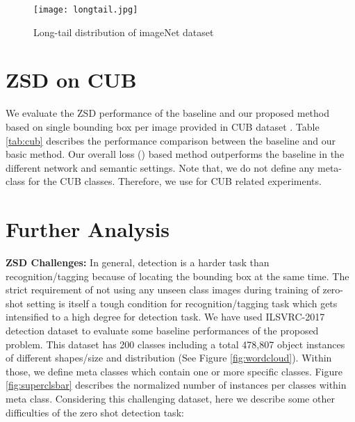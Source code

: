 \documentclass[runningheads]{llncs}
\begin{document}
\begin{figure}[t]
  \begin{center}
   \texttt{[image: longtail.jpg]}
\end{center}
   \caption{Long-tail distribution of imageNet dataset}
\label{fig:longtail}
\end{figure}

    \begin{table}[!t]
  \begin{center}
  \end{center}
  \caption{ZSD on CUB using . We refer V=VGG and R=ResNet}
  \label{tab:cub}
\end{table}

\section{ZSD on CUB} \label{sec:cub}
We evaluate the ZSD performance of the baseline and our proposed method based on single bounding box per image provided in CUB dataset \cite{CUB_2011}. Table \ref{tab:cub} describes the performance comparison between the baseline and our basic method. Our overall loss () based method outperforms the baseline in the different network and semantic settings. Note that, we do not define any meta-class for the CUB classes. Therefore, we use  for CUB related experiments.

\section{Further Analysis} \label{sec:further}

\textbf{ZSD Challenges:} In general, detection is a harder task than recognition/tagging because of locating the bounding box at the same time. The strict requirement of not using any unseen class images during training of zero-shot setting is itself a tough condition for recognition/tagging task which gets intensified to a high degree for detection task. We have used ILSVRC-2017 detection dataset to evaluate some baseline performances of the proposed problem. This dataset has 200 classes including a total 478,807 object instances of different shapes/size and distribution (See Figure \ref{fig:wordcloud}). Within those, we define  meta classes which contain one or more specific classes. Figure \ref{fig:superclsbar} describes the normalized number of instances per classes within meta class. Considering this challenging dataset, here we describe some other difficulties of the zero shot detection task:
\end{document}
